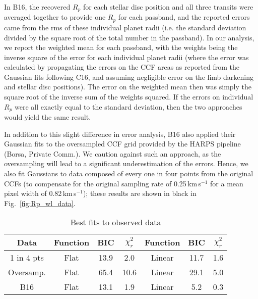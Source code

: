 \documentclass{aa}
\begin{document}
In B16, the recovered $R_p$ for each stellar disc position and all three transits were averaged together to provide one $R_p$ for each passband, and the reported errors came from the rms of these individual planet radii (i.e. the standard deviation divided by the square root of the total number in the passband). In our analysis, we report the weighted mean for each passband, with the weights being the inverse square of the error for each individual planet radii (where the error was calculated by propagating the errors on the CCF areas as reported from the Gaussian fits following C16, and assuming negligible error on the limb darkening and stellar disc positions). The error on the weighted mean then was simply the square root of the inverse sum of the weights squared. If the errors on individual $R_p$ were all exactly equal to the standard deviation, then the two approaches would yield the same result. 

In addition to this slight difference in error analysis, B16 also applied their Gaussian fits to the oversampled CCF grid provided by the HARPS pipeline (Borsa, Private Comm.). We caution against such an approach, as the oversampling will lead to a significant underestimation of the errors. Hence, we also fit Gaussians to data composed of every one in four points from the original CCFs (to compensate for the original sampling rate of 0.25\,km\,s$^{-1}$ for a mean pixel width of 0.82\,km\,s$^{-1}$); these results are shown in black in Fig.~\ref{fig:Rp_wl_data}.

\begin{table}[t!]
\caption[]{Best fits to observed data}
\centering
\begin{tabular}{c|c|c|c|c|c|c}
    \hline
    \hline
    Data & Function & BIC & $\chi^2_r$ & Function & BIC & $\chi^2_r$ \\
    \hline  
1 in 4 pts & Flat &  13.9 & 2.0 & Linear &  11.7 & 1.6 \\
Oversamp. & Flat &  65.4 & 10.6 & Linear &  29.1 & 5.0 \\
B16 & Flat &  13.1 & 1.9 & Linear &  5.2 & 0.3 \\
    \hline  
  \end{tabular}
\label{tab:bestfit}
\vspace{-15pt}
\end{table}
\end{document}
